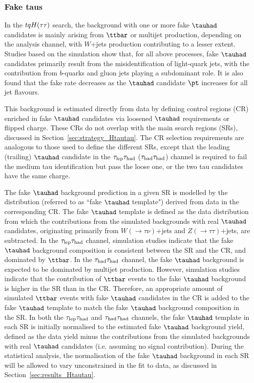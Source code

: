 \subsubsection{Fake taus}
\label{sec:faketaus}
In the $tqH(\tau\tau)$ search, the background with one or more fake $\tauhad$ candidates is mainly arising from $\ttbar$ or
multijet production, depending on the analysis channel, with $W$+jets production contributing to a lesser extent. 
Studies based on the simulation show that, for all above processes, fake $\tauhad$ candidates primarily result from the 
misidentification of light-quark jets, with the contribution from $b$-quarks and gluon jets playing a subdominant role.
It is also found that the fake rate decreases as the $\tauhad$ candidate $\pt$ increases for all jet flavours.

This background is estimated directly from data by defining control regions (CR) enriched in fake $\tauhad$ candidates via loosened $\tauhad$ requirements or flipped charge. These CRs do not overlap with the main search regions (SRs), discussed in Section~\ref{sec:strategy_Htautau}. The CR selection requirements are analogous to those used to define the different SRs, except that the leading (trailing) $\tauhad$ candidate 
in the $\tau_{\mathrm{lep}} \tau_{\mathrm{had}}$ ($\tau_{\mathrm{had}} \tau_{\mathrm{had}}$) channel is required to fail the medium tau identification but pass the loose one, or the two tau candidates have the same charge.

The fake $\tauhad$ background prediction in a given SR is modelled by the distribution (referred to as ``fake $\tauhad$ template") derived from data in the corresponding CR. The fake $\tauhad$ template is defined as the data distribution from which the contributions from the simulated backgrounds with real $\tauhad$ candidates, originating primarily from 
$W(\to \tau\nu)$+jets and $Z(\to \tau\tau)$+jets, are subtracted. In the $\tau_{\mathrm{lep}} \tau_{\mathrm{had}}$ channel, simulation studies indicate that the fake $\tauhad$ background composition is consistent between the SR and the CR, and dominated by $\ttbar$. In the $\tau_{\mathrm{had}} \tau_{\mathrm{had}}$ channel, the fake $\tauhad$ background is expected to be dominated by multijet production. However, simulation studies indicate that the contribution of $\ttbar$ events to the fake $\tauhad$ background is higher in the SR than in the CR. Therefore, an appropriate amount of simulated $\ttbar$ events with fake $\tauhad$ candidates in the CR is added to the fake $\tauhad$ template to match the fake $\tauhad$ background composition in the SR. 
In both the $\tau_{\mathrm{lep}} \tau_{\mathrm{had}}$ and $\tau_{\mathrm{had}} \tau_{\mathrm{had}}$ channels, the fake $\tauhad$ template in each SR is initially normalised to the estimated fake $\tauhad$ background yield, 
defined as the data yield minus the contributions from the simulated backgrounds with real $\tauhad$ candidates (i.e. assuming no signal contribution).
During the statistical analysis, the normalisation of the fake $\tauhad$ background in each SR will be allowed to vary unconstrained in the fit to data, as discussed in Section~\ref{sec:results_Htautau}.

